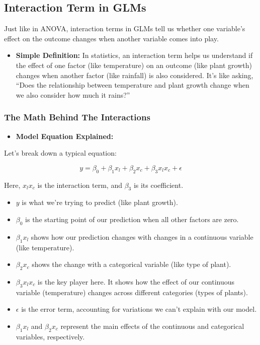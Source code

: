 \documentclass[
  letterpaper,
  DIV=11,
  numbers=noendperiod]{scrreprt}
\providecommand{\tightlist}{%
  \setlength{\itemsep}{0pt}\setlength{\parskip}{0pt}}\usepackage{longtable,booktabs,array}
\begin{document}
\subsection{Interaction Term in GLMs}\label{interaction-term-in-glms}

Just like in ANOVA, interaction terms in GLMs tell us whether one
variable's effect on the outcome changes when another variable comes
into play.

\begin{itemize}
\tightlist
\item
  \textbf{Simple Definition:} In statistics, an interaction term helps
  us understand if the effect of one factor (like temperature) on an
  outcome (like plant growth) changes when another factor (like
  rainfall) is also considered. It's like asking, ``Does the
  relationship between temperature and plant growth change when we also
  consider how much it rains?''
\end{itemize}

\subsubsection{The Math Behind The
Interactions}\label{the-math-behind-the-interactions}

\begin{itemize}
\tightlist
\item
  \textbf{Model Equation Explained:}
\end{itemize}

Let's break down a typical equation:

\[
y = \beta_0 + \beta_1x_l + \beta_2x_c + \beta_3x_lx_c + \epsilon
\]

Here, \(x_lx_c\) is the interaction term, and \(\beta _3\) is its
coefficient.

\begin{itemize}
\tightlist
\item
  \(y\) is what we're trying to predict (like plant growth).
\item
  \(\beta_0\) is the starting point of our prediction when all other
  factors are zero.
\item
  \(\beta_1x_l\) shows how our prediction changes with changes in a
  continuous variable (like temperature).
\item
  \(\beta_2x_c\) shows the change with a categorical variable (like type
  of plant).
\item
  \(\beta_3x_lx_c\) is the key player here. It shows how the effect of
  our continuous variable (temperature) changes across different
  categories (types of plants).
\item
  \(\epsilon\) is the error term, accounting for variations we can't
  explain with our model.
\item
  \(\beta_1x_l\) and \(\beta_2x_c\) represent the main effects of the
  continuous and categorical variables, respectively.
\end{itemize}
\end{document}
